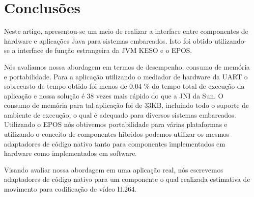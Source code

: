 \section{Conclusões}
\label{sec:discussion}
%
%
Neste artigo, apresentou-se um meio de realizar a interface entre componentes 
de hardware e aplicações Java para sistemas embarcados. 
Isto foi obtido utilizando-se a interface de função estrangeira da JVM KESO e o
EPOS.



Nós avaliamos nossa abordagem em termos de desempenho, consumo de memória e 
portabilidade.
Para a aplicação utilizando o mediador de hardware da UART o sobrecusto 
de tempo obtido foi menos de 0.04 \% do tempo total de execução da aplicação e
nossa solução é 38 vezes mais rápido do que a JNI da Sun.
O consumo de memória para tal aplicação foi de 33KB, incluindo todo o suporte
de ambiente de execução, o qual é adequado para diversos sistemas embarcados.
Utilizando o EPOS nós obtivemos portabilidade para várias plataformas e 
utilizando o conceito de componentes híbridos podemos utilizar os mesmos 
adaptadores de código nativo tanto para componentes implementados em 
hardware como implementados em software.

Visando avaliar nossa abordagem em uma aplicação real, nós escrevemos
adaptadores de código nativo para um componente o qual realizada estimativa de
movimento para codificação de vídeo H.264.


